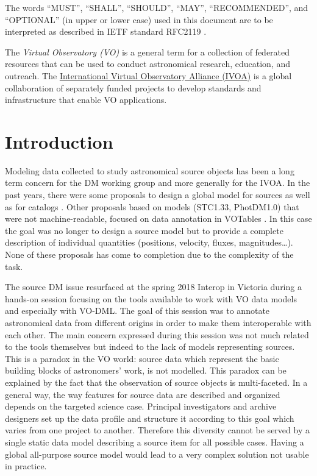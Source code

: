 \documentclass[11pt,a4paper]{ivoa}
\begin{document}
The words ``MUST'', ``SHALL'', ``SHOULD'', ``MAY'', ``RECOMMENDED'', and
``OPTIONAL'' (in upper or lower case) used in this document are to be
interpreted as described in IETF standard RFC2119 \citep{std:RFC2119}.

The \emph{Virtual Observatory (VO)} is a
general term for a collection of federated resources that can be used
to conduct astronomical research, education, and outreach.
The \href{http://www.ivoa.net}{International
Virtual Observatory Alliance (IVOA)} is a global
collaboration of separately funded projects to develop standards and
infrastructure that enable VO applications.


\section{Introduction}

Modeling data collected to study astronomical source objects has been a long term concern for the 
DM working group and more generally for the IVOA.
In the past years, there were some proposals to design a global model for sources \citep{wd:jesusdm}
as well as for catalogs \citep{wd:catalog}.
Other proposals based on models (STC1.33, PhotDM1.0) that were not machine-readable, focused on data annotation in 
VOTables \citep{note:stcvot} \citep{note:seb}.
In this case the goal was no longer to design a source model but to provide a complete description of
individual quantities (positions, velocity, fluxes, magnitudes…).
None of these proposals has come to completion due to the complexity of the task.

The source DM issue resurfaced at the spring 2018 Interop in Victoria during a hands-on session
focusing on the tools available to work with VO data models and especially with VO-DML.
The goal of this session was to annotate astronomical data from different origins in order to make them
interoperable with each other. The main concern expressed during this session was not much related to the tools themselves but indeed to the lack of models representing sources.
This is a paradox in the VO world: source data which represent the basic building
blocks of astronomers' work, is not modelled.
This paradox can be explained by the fact that the observation of source objects is multi-faceted.
In a general way, the way features for source data are described and organized depends on
the targeted science case.
Principal investigators and archive designers set up the data profile and structure it according
to this goal which varies from one project to another.
Therefore this diversity cannot be served by a single static data model describing a source
item for all possible cases.
Having a global all-purpose source model would lead to a very complex solution not usable in practice.
\end{document}
